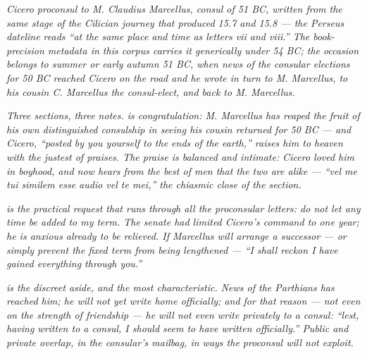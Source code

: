 
\textit{Cicero proconsul to M. Claudius Marcellus, consul of
51 BC, written from the same stage of the Cilician journey
that produced 15.7 and 15.8 --- the Perseus dateline reads
``at the same place and time as letters vii and viii.'' The
book-precision metadata in this corpus carries it generically
under 54 BC; the occasion belongs to summer or early autumn 51
BC, when news of the consular elections for 50 BC reached
Cicero on the road and he wrote in turn to M. Marcellus,
to his cousin C. Marcellus the consul-elect, and back to M.
Marcellus.}

\textit{Three sections, three notes.  is
congratulation: M. Marcellus has reaped the fruit of his own
distinguished consulship in seeing his cousin returned for
50 BC --- and Cicero, ``posted by you yourself to the ends
of the earth,'' raises him to heaven with the justest of
praises. The praise is balanced and intimate: Cicero loved
him in boyhood, and now hears from the best of men that the
two are alike --- ``vel me tui similem esse audio vel te mei,''
the chiasmic close of the section.}

\textit{ is the practical request that runs
through all the proconsular letters: do not let any time be
added to my term. The senate had limited Cicero's command to
one year; he is anxious already to be relieved. If Marcellus
will arrange a successor --- or simply prevent the fixed term
from being lengthened --- ``I shall reckon I have gained
everything through you.''}

\textit{ is the discreet aside, and the most
characteristic. News of the Parthians has reached him; he
will not yet write home officially; and for that reason ---
not even on the strength of friendship --- he will not even
write privately to a consul: ``lest, having written to a
consul, I should seem to have written officially.'' Public
and private overlap, in the consular's mailbag, in ways the
proconsul will not exploit.}
